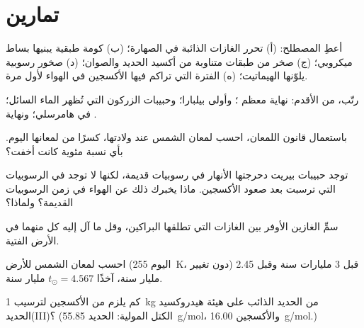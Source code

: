 \section{تمارين}

\begin{exercise}[$\star$]\label{exo:g12:early-earth:1}
أعطِ المصطلح: (أ) تحرر الغازات الذائبة في الصهارة؛ (ب) كومة طبقية
يبنيها بساط ميكروبي؛ (ج) صخر من طبقات متناوبة من أكسيد الحديد
والصوان؛ (د) صخور رسوبية يلوّنها الهيماتيت؛ (ه) الفترة
التي تراكم فيها الأكسجين في الهواء لأول مرة.
\end{exercise}

\begin{exercise}[$\star$]\label{exo:g12:early-earth:2}
رتّب، من الأقدم: نهاية معظم ؛ وأولى
 بيلبارا؛ وحبيبات الزركون التي تُظهر الماء السائل؛  في هامرسلي؛ ونهاية .
\end{exercise}

\begin{exercise}[$\star$]\label{exo:g12:early-earth:3}
باستعمال قانون اللمعان، احسب لمعان الشمس عند ولادتها، كسرًا
من لمعانها اليوم. بأي نسبة مئوية كانت أخفت؟
\end{exercise}

\begin{exercise}[$\star$]\label{exo:g12:early-earth:4}
توجد حبيبات بيريت دحرجتها الأنهار في رسوبيات قديمة، لكنها لا توجد في
الرسوبيات التي ترسبت بعد صعود الأكسجين. ماذا يخبرك ذلك عن
الهواء في زمن الرسوبيات القديمة؟ ولماذا؟
\end{exercise}

\begin{exercise}[$\star$]\label{exo:g12:early-earth:5}
سمِّ الغازين الأوفر بين الغازات التي تطلقها البراكين، وقل ما آل إليه
كل منهما في الأرض الفتية.
\end{exercise}

\begin{exercise}[$\star\star$]\label{exo:g12:early-earth:6}
احسب لمعان الشمس  للأرض (اليوم
\qty{255}{K}،  دون تغيير) قبل 3 مليارات سنة وقبل 2.45 مليار
سنة، آخذًا $t_\odot = 4.567$ مليار سنة.
\end{exercise}

\begin{exercise}[$\star\star$]\label{exo:g12:early-earth:7}
كم يلزم من الأكسجين لترسيب \qty{1}{kg} من الحديد الذائب على هيئة
هيدروكسيد الحديد(III)؟ (الكتل المولية: الحديد \qty{55.85}{g/mol}، والأكسجين
\qty{16.00}{g/mol}.)
\end{exercise}

